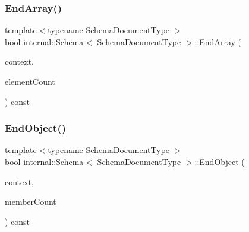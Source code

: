 \mbox{\label{classinternal_1_1Schema_a7cae24caa7c2de31e7c5c07d23c737b3}} 
\subsubsection{\texorpdfstring{End\+Array()}{EndArray()}}
{\footnotesize\ttfamily template$<$typename Schema\+Document\+Type $>$ \\
bool \hyperlink{classinternal_1_1Schema}{internal\+::\+Schema}$<$ Schema\+Document\+Type $>$\+::End\+Array (\begin{DoxyParamCaption}\item[{\hyperlink{classinternal_1_1Schema_ac3f54abfefe300c5610c1205869cfd66}{Context} \&}]{context,  }\item[{\hyperlink{rapidjson_8h_a5ed6e6e67250fadbd041127e6386dcb5}{Size\+Type}}]{element\+Count }\end{DoxyParamCaption}) const\hspace{0.3cm}{\ttfamily [inline]}}

\mbox{\label{classinternal_1_1Schema_a5f74464dae5d41d5cbf626c8d6729d8a}} 
\subsubsection{\texorpdfstring{End\+Object()}{EndObject()}}
{\footnotesize\ttfamily template$<$typename Schema\+Document\+Type $>$ \\
bool \hyperlink{classinternal_1_1Schema}{internal\+::\+Schema}$<$ Schema\+Document\+Type $>$\+::End\+Object (\begin{DoxyParamCaption}\item[{\hyperlink{classinternal_1_1Schema_ac3f54abfefe300c5610c1205869cfd66}{Context} \&}]{context,  }\item[{\hyperlink{rapidjson_8h_a5ed6e6e67250fadbd041127e6386dcb5}{Size\+Type}}]{member\+Count }\end{DoxyParamCaption}) const\hspace{0.3cm}{\ttfamily [inline]}}

\mbox{\label{classinternal_1_1Schema_afced5d191620cfdf0971fdd30b004686}} 
